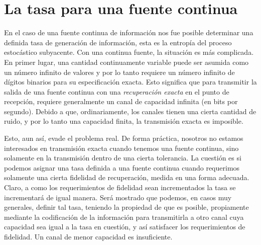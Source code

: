 \chapter{La tasa para una fuente continua}

En el caso de una fuente continua de informaci\'on nos fue posible
determinar una definida tasa de generaci\'on de informaci\'on, esta es
la entrop\'ia del proceso estoc\'astico subyacente. Con una continua
fuente, la situaci\'on es m\'as complicada. En primer lugar, una
cantidad continuamente variable puede ser asumida como un n\'umero
infinito de valores y por lo tanto requiere un n\'umero infinito de
d\'igitos binarios para su especificaci\'on exacta. Esto significa que
para transmitir la salida de una fuente continua con una {\em
 recuperaci\'on exacta} en el punto de recepci\'on, requiere
generalmente un canal de capacidad infinita (en bits por
segundo). Debido a que, ordinariamente, los canales tienen una cierta
cantidad de ruido, y por lo tanto una capacidad finita, la
transmisi\'on exacta es imposible.

Esto, aun as\'i, evade el problema real. De forma pr\'actica, nosotros
no estamos interesados en transmisi\'on exacta cuando tenemos una
fuente continua, sino solamente en la transmisi\'on dentro de una
cierta tolerancia. La cuesti\'on es si podemos asignar una tasa
definida a una fuente continua cuando requerimos solamente una cierta
fidelidad de recuperaci\'on, medida en una forma adecuada. Claro, a
como los requerimientos de fidelidad sean incrementados la tasa se
incrementar\'a de igual manera. Ser\'a mostrado que podemos, en casos
muy generales, definir tal tasa, teniendo la propiedad de que es
posible, propiamente mediante la codificaci\'on de la informaci\'on
para transmitirla a otro canal cuya capacidad sea igual a la tasa en
cuesti\'on, y as\'i satisfacer los requerimientos de fidelidad. Un
canal de menor capacidad es insuficiente.

